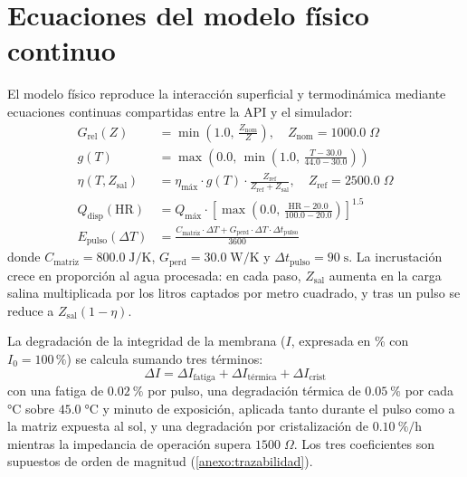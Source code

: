 \section{Ecuaciones del modelo f\'isico continuo}
\label{sec:ecuaciones}
El modelo f\'isico reproduce la interacci\'on superficial y termodin\'amica mediante ecuaciones continuas compartidas entre la API y el simulador:
\begin{align}
  G_{\text{rel}}(Z) &= \min\left(1.0,\, \frac{Z_{\text{nom}}}{Z}\right), \quad Z_{\text{nom}} = 1000.0\;\Omega \label{eq:conductancia} \\
  g(T) &= \max\left(0.0,\, \min\left(1.0,\, \frac{T - 30.0}{44.0 - 30.0}\right)\right) \label{eq:factor_temp} \\
  \eta(T, Z_{\text{sal}}) &= \eta_{\text{m\'ax}} \cdot g(T) \cdot \frac{Z_{\text{ref}}}{Z_{\text{ref}} + Z_{\text{sal}}}, \quad Z_{\text{ref}} = 2500.0\;\Omega \label{eq:eficacia} \\
  Q_{\text{disp}}(\text{HR}) &= Q_{\text{m\'ax}} \cdot \left[\max\left(0.0,\, \frac{\text{HR} - 20.0}{100.0 - 20.0}\right)\right]^{1.5} \label{eq:flujo} \\
  E_{\text{pulso}}(\Delta T) &= \frac{C_{\text{matriz}} \cdot \Delta T + G_{\text{perd}} \cdot \Delta T \cdot \Delta t_{\text{pulso}}}{3600} \label{eq:energia}
\end{align}
donde $C_{\text{matriz}} = 800.0\;\text{J/K}$, $G_{\text{perd}} = 30.0\;\text{W/K}$ y $\Delta t_{\text{pulso}} = 90\;\text{s}$. La incrustaci\'on crece en proporci\'on al agua procesada: en cada paso, $Z_{\text{sal}}$ aumenta en la carga salina multiplicada por los litros captados por metro cuadrado, y tras un pulso se reduce a $Z_{\text{sal}}(1-\eta)$.

La degradaci\'on de la integridad de la membrana ($I$, expresada en \% con $I_0 = 100\,\%$) se calcula sumando tres t\'erminos:
\begin{equation}
  \Delta I = \Delta I_{\text{fatiga}} + \Delta I_{\text{t\'ermica}} + \Delta I_{\text{crist}}
\end{equation}
con una fatiga de $\SI{0.02}{\percent}$ por pulso, una degradaci\'on t\'ermica de $\SI{0.05}{\percent}$ por cada $\si{\celsius}$ sobre $45.0\;\si{\celsius}$ y minuto de exposici\'on, aplicada tanto durante el pulso como a la matriz expuesta al sol, y una degradaci\'on por cristalizaci\'on de $\SI{0.10}{\percent\per\hour}$ mientras la impedancia de operaci\'on supera $1500\;\Omega$. Los tres coeficientes son supuestos de orden de magnitud (\cref{anexo:trazabilidad}).

